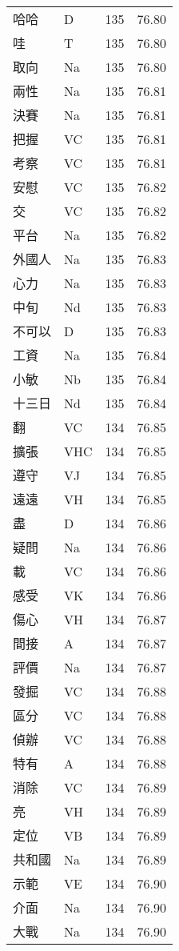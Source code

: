 \documentclass[twocolumn]{book}
\begin{document}
\begin{supertabular}{llrr}
哈哈 & D & 135 &  76.80\\
哇 & T & 135 &  76.80\\
取向 & Na & 135 &  76.80\\
兩性 & Na & 135 &  76.81\\
決賽 & Na & 135 &  76.81\\
把握 & VC & 135 &  76.81\\
考察 & VC & 135 &  76.81\\
安慰 & VC & 135 &  76.82\\
交 & VC & 135 &  76.82\\
平台 & Na & 135 &  76.82\\
外國人 & Na & 135 &  76.83\\
心力 & Na & 135 &  76.83\\
中旬 & Nd & 135 &  76.83\\
不可以 & D & 135 &  76.83\\
工資 & Na & 135 &  76.84\\
小敏 & Nb & 135 &  76.84\\
十三日 & Nd & 135 &  76.84\\
翻 & VC & 134 &  76.85\\
擴張 & VHC & 134 &  76.85\\
遵守 & VJ & 134 &  76.85\\
遠遠 & VH & 134 &  76.85\\
盡 & D & 134 &  76.86\\
疑問 & Na & 134 &  76.86\\
載 & VC & 134 &  76.86\\
感受 & VK & 134 &  76.86\\
傷心 & VH & 134 &  76.87\\
間接 & A & 134 &  76.87\\
評價 & Na & 134 &  76.87\\
發掘 & VC & 134 &  76.88\\
區分 & VC & 134 &  76.88\\
偵辦 & VC & 134 &  76.88\\
特有 & A & 134 &  76.88\\
消除 & VC & 134 &  76.89\\
亮 & VH & 134 &  76.89\\
定位 & VB & 134 &  76.89\\
共和國 & Na & 134 &  76.89\\
示範 & VE & 134 &  76.90\\
介面 & Na & 134 &  76.90\\
大戰 & Na & 134 &  76.90\\

\end{supertabular}
\end{document}
